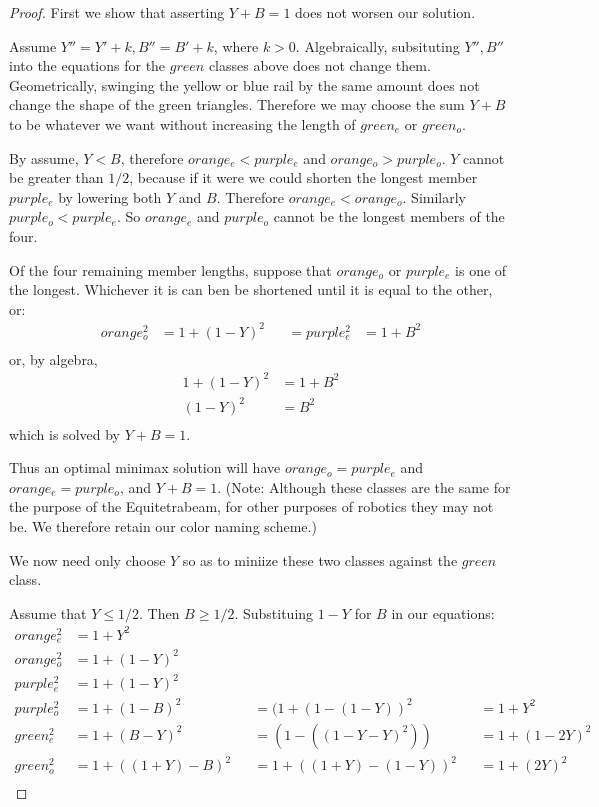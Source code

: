 \documentclass[11pt]{article}
\begin{document}
 \begin{proof}
   First we show that asserting $Y + B = 1$ does not worsen our solution.

   Assume $Y'' = Y' + k, B'' = B' + k$, where $k > 0$. Algebraically, subsituting $Y'', B''$ into the equations for the $green$
   classes above does not change them. Geometrically, swinging  the yellow or blue rail by the same amount does not change the
   shape of the green triangles. Therefore we may choose the sum $ Y+B $ to be whatever we want without increasing the length
   of $green_e$ or $green_o$.

   By assume, $Y < B$, therefore $orange_e < purple_e$ and $orange_o > purple_o$. $Y$ cannot be greater than $1/2$, because
   if it were we could shorten the longest member $purple_e$ by lowering both $Y$ and $B$. Therefore $orange_e < orange_o$.
   Similarly $purple_o < purple_e$. So $orange_e$ and $purple_o$ cannot be the longest members of the four.

   Of the four remaining member lengths, suppose that $orange_o$ or $purple_e$ is one of the longest. Whichever it is can ben be shortened
   until it is equal to the other, or:
 \begin{align*}
 orange_o^2  &= 1 + (1-Y)^2 & &=  purple_e^2  &= 1 + B^2\\
 \end{align*}
 or, by algebra,
 \begin{align*}
   1 + (1-Y)^2 &= 1 + B^2\\
   (1-Y)^2 &= B^2\\
 \end{align*}
 which is solved by $Y+B = 1$.

 Thus an optimal minimax solution will have $orange_o = purple_e$ and $orange_e = purple_o$, and $Y+B = 1$.
 (Note: Although these classes are the same for the purpose of the Equitetrabeam, for other purposes of robotics
 they may not be. We therefore retain our color naming scheme.)

 We now need only choose $Y$ so as to miniize these two classes against the $green$ class.

   Assume that $Y \leq 1/2$. Then $B \geq 1/2$. Substituing $1 - Y$ for $B$ in our equations:
 \begin{align*}
   orange_e^2 &= 1 + Y^2 \\
 orange_o^2 &= 1 + (1-Y)^2 \\
 purple_e^2 &=  1 + (1-Y)^2 \\
 purple_o^2 &=   1+ (1-B)^2 & &= (1 + (1 - (1 - Y))^2 & & = 1 + Y^2 \\
 green_e^2 &=  1 + (B - Y)^2 & &= (1 - ((1 - Y - Y)^2)) & &= 1 + (1 - 2Y)^2\\ 
 green_o^2 &= 1 + ((1+Y) - B)^2 & &= 1 + ((1+Y) - (1 - Y))^2 & &= 1 + (2Y)^2 \\
 \end{align*}


\end{proof}
\end{document}

